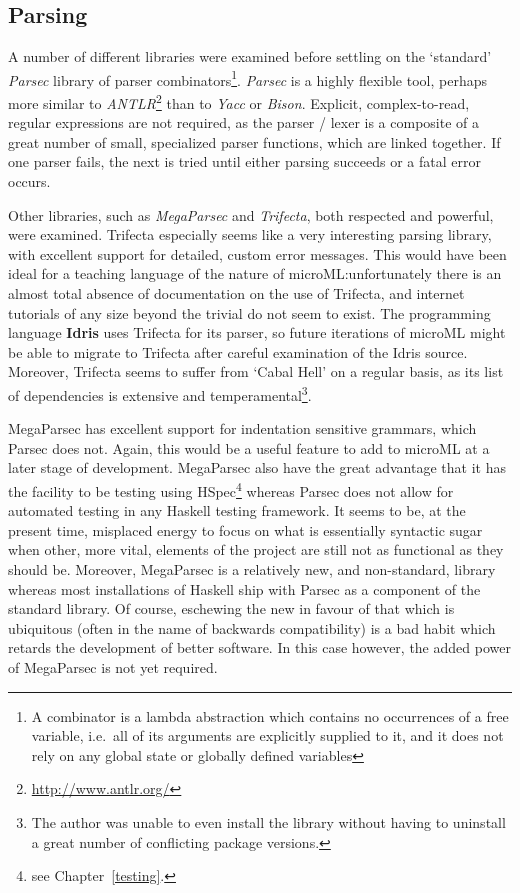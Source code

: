 \documentclass[12pt, a4paper]{report}
\begin{document}
\subsection{Parsing}
\label{parsing}
A number of different libraries were examined before settling on the `standard' \textit{Parsec}
library of parser combinators\footnote{A combinator is a lambda abstraction which contains no
occurrences of a free variable, i.e.\ all of its arguments are explicitly supplied to it, and it
does not rely on any global state or globally defined variables}. \textit{Parsec} is a highly
flexible tool, perhaps more similar to \textit{ANTLR}\footnote{\url{http://www.antlr.org/}} than
to \textit{Yacc} or \textit{Bison}. Explicit, complex-to-read, regular expressions are not required, as the parser
/ lexer is a composite of a great number of small, specialized parser functions, which are linked
together. If one parser fails, the next is tried until either parsing succeeds or a fatal error
occurs.

Other libraries, such as \textit{MegaParsec} and \textit{Trifecta}, both respected and powerful,
were examined. Trifecta especially seems like a very interesting parsing library, with excellent
support for detailed, custom error messages. This would have been ideal for a teaching language
of the nature of microML:\@ unfortunately there is an almost total absence of documentation on the
use of Trifecta, and internet tutorials of any size beyond the trivial do not seem to exist. The
programming language \textbf{Idris} uses Trifecta for its parser, so future iterations of microML
might be able to migrate to Trifecta after careful examination of the Idris source. Moreover,
Trifecta seems to suffer from `Cabal Hell' on a regular basis, as its list of dependencies is
extensive and temperamental\footnote{The author was unable to even install the library without
having to uninstall a great number of conflicting package versions.}.

MegaParsec has excellent support for indentation sensitive grammars, which Parsec does not. Again,
this would be a useful feature to add to microML at a later stage of development. MegaParsec
also have the great advantage that it has the facility to be testing using HSpec\footnote{see
Chapter~\ref{testing}.} whereas Parsec does not allow for automated testing in any Haskell
testing framework. It seems to be, at the present time, misplaced energy to focus on what
is essentially syntactic sugar when other, more vital, elements of the project are still not
as functional as they should be. Moreover, MegaParsec is a relatively new,
and non-standard, library whereas most installations of Haskell ship with Parsec as a component of
the standard library. Of course, eschewing the new in favour of that which is ubiquitous (often
in the name of backwards compatibility) is a bad habit which retards the development of better
software. In this case however, the added power of MegaParsec is not yet required.
\end{document}
